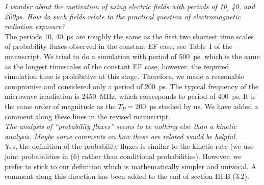 \documentclass[]{revtex4-1}
\begin{document}
\emph{ I wonder about the motivation of using electric fields with
  periods of 10, 40, and 200ps. How do such fields relate to the
  practical question of electromagnetic radiation exposure?  }\\

The periods 10, 40~ps are roughly the same as the first two shortest
time scales of probability fluxes observed in the constant EF case,
see Table~I of the manuscript. We tried to do a simulation with period of
500~ps, which is the same as the longest timescales of the constant EF
case, however, the required simulation time is prohibitive at this stage. Therefore, we made a reasonable compromise and considered only
a period of 200~ps. The typical frequency of the microwave
irradiation is 2450~MHz, which corresponds to period of 400~ps. It is
the same order of magnitude as the $T_P=200$~ps studied by us.
We have added a comment along these lines in the revised manuscript.
\\

\emph{ The analysis of ``probability fluxes'' seems to be nothing else
  than a kinetic analysis. Maybe some comments on how these are
  related would be helpful.  }\\

Yes, the definition of the probability fluxes is similar to the
kinetic rate (we use joint probabilities in (6) rather than
conditional probabilities).
However, we prefer to stick to our definition which
is mathematically simpler and univocal.
A comment along this direction has been added to the end of section III.B (3.2).
\\
\end{document}
